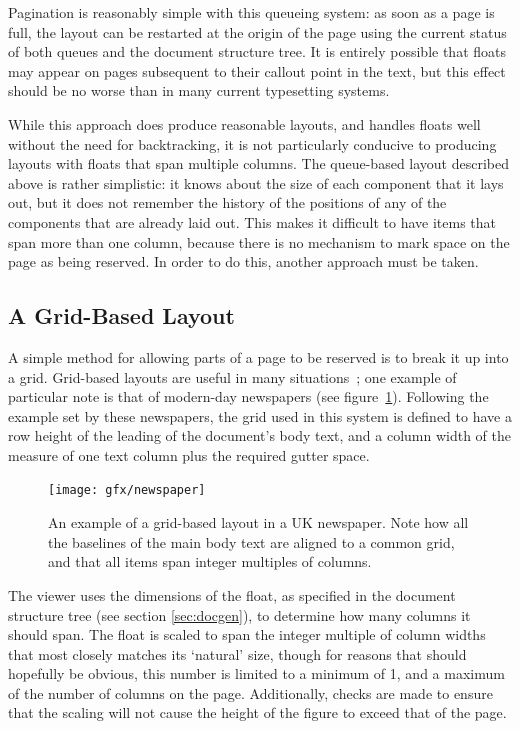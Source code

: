 Pagination is reasonably simple with this queueing system: as soon as a page is full, the layout can be restarted at the origin of the page using the current status of both queues and the document structure tree. It is entirely possible that floats may appear on pages subsequent to their callout point in the text, but this effect should be no worse than in many current typesetting systems.

While this approach does produce reasonable layouts, and handles floats well without the need for backtracking, it is not particularly conducive to producing layouts with floats that span multiple columns. The queue-based layout described above is rather simplistic: it knows about the size of each component that it lays out, but it does not remember the history of the positions of any of the components that are already laid out. This makes it difficult to have items that span more than one column, because there is no mechanism to mark space on the page as being reserved. In order to do this, another approach must be taken.

\subsection{A Grid-Based Layout}
A simple method for allowing parts of a page to be reserved is to break it up into a grid. Grid-based layouts are useful in many situations~\cite{Collier1991}; one example of particular note is that of modern-day newspapers (see figure~\ref{fig:gridlayout}). Following the example set by these newspapers, the grid used in this system is defined to have a row height of the \gls{leading} of the document's body text, and a column width of the \gls{measure} of one text column plus the required gutter space.

\begin{figure}
    \texttt{[image: gfx/newspaper]}
    \caption[An example of a grid-based layout]{An example of a grid-based layout in a UK newspaper. Note how all the baselines of the main body text are aligned to a common grid, and that all items span integer multiples of columns.}
    \label{fig:gridlayout}
\end{figure}

The viewer uses the dimensions of the float, as specified in the document structure tree (see section \ref{sec:docgen}), to determine how many columns it should span. The float is scaled to span the integer multiple of column widths that most closely matches its `natural' size, though for reasons that should hopefully be obvious, this number is limited to a minimum of 1, and a maximum of the number of columns on the page. Additionally, checks are made to ensure that the scaling will not cause the height of the figure to exceed that of the page.

